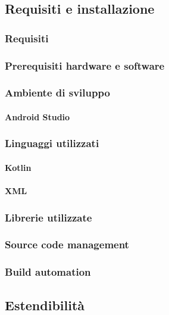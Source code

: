 \subsection{Requisiti e installazione}


\subsubsection{Requisiti}

\subsubsection{Prerequisiti hardware e software}

\subsubsection{Ambiente di sviluppo}

\paragraph{Android Studio}

\subsubsection{Linguaggi utilizzati}

\paragraph{Kotlin}

\paragraph{XML}

\subsubsection{Librerie utilizzate}

\subsubsection{Source code management}

\subsubsection{Build automation}


\subsection{Estendibilità}


